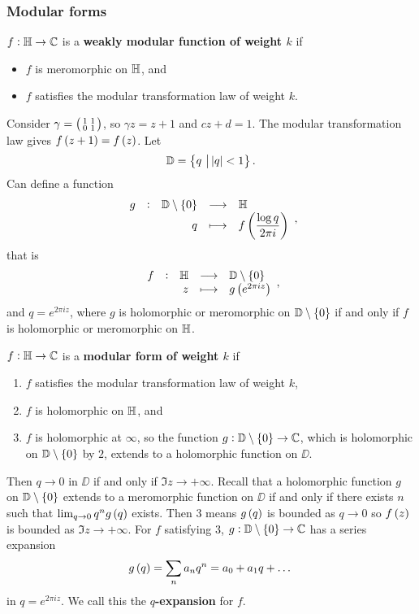 \subsubsection{Modular forms}

\begin{definition}
$ f : \mathbb{H} \to \mathbb{C} $ is a \textbf{weakly modular function of weight $ k $} if
\begin{itemize}
\item $ f $ is meromorphic on $ \mathbb{H} $, and
\item $ f $ satisfies the modular transformation law of weight $ k $.
\end{itemize}
\end{definition}

Consider $ \gamma = \begin{psmallmatrix} 1 & 1 \\ 0 & 1 \end{psmallmatrix} $, so $ \gamma z = z + 1 $ and $ cz + d = 1 $. The modular transformation law gives $ f\br{z + 1} = f\br{z} $. Let
$$ \DD = \cbr{q \st \abs{q} < 1}. $$
Can define a function
$$ \function[g]{\DD \setminus \cbr{0}}{\HH}{q}{f\br{\dfrac{\log q}{2\pi i}}}, $$
that is
$$ \function[f]{\HH}{\DD \setminus \cbr{0}}{z}{g\br{e^{2\pi iz}}}, $$
and $ q = e^{2\pi iz} $, where $ g $ is holomorphic or meromorphic on $ \DD \setminus \cbr{0} $ if and only if $ f $ is holomorphic or meromorphic on $ \mathbb{H} $.

\begin{definition}
$ f : \mathbb{H} \to \mathbb{C} $ is a \textbf{modular form of weight $ k $} if
\begin{enumerate}
\item $ f $ satisfies the modular transformation law of weight $ k $,
\item $ f $ is holomorphic on $ \mathbb{H} $, and
\item $ f $ is holomorphic at $ \infty $, so the function $ g : \DD \setminus \cbr{0} \to \CC $, which is holomorphic on $ \DD \setminus \cbr{0} $ by $ 2 $, extends to a holomorphic function on $ \DD $.
\end{enumerate}
\end{definition}


Then $ q \to 0 $ in $ \DD $ if and only if $ \Im z \to +\infty $. Recall that a holomorphic function $ g $ on $ \DD \setminus \cbr{0} $ extends to a meromorphic function on $ \DD $ if and only if there exists $ n $ such that $ \lim_{q \to 0} q^ng\br{q} $ exists. Then $ 3 $ means $ g\br{q} $ is bounded as $ q \to 0 $ so $ f\br{z} $ is bounded as $ \Im z \to +\infty $. For $ f $ satisfying $ 3 $, $ g : \DD \setminus \cbr{0} \to \CC $ has a series expansion
$$ g\br{q} = \sum_n a_nq^n = a_0 + a_1q + \dots $$
in $ q = e^{2\pi iz} $. We call this the \textbf{$ q $-expansion} for $ f $.

